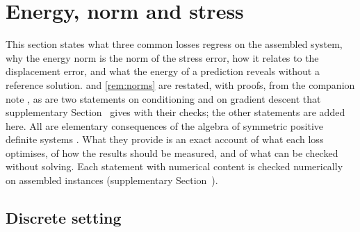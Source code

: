 \section{Energy, norm and stress}\label{sec:theory}

This section states what three common losses regress on the assembled system, why the energy
norm is the norm of the stress error, how it relates to the displacement error, and what the
energy of a prediction reveals without a reference solution.  and
\cref{rem:norms} are restated, with proofs, from the companion note \cite{CaoSong2026}, as
are two statements on conditioning and on gradient descent that supplementary
Section~\SuppRepro{} gives with their checks; the other statements are added here. All are
elementary consequences of the algebra of symmetric positive definite systems
\cite{Ciarlet1978,Saad2003}. What they provide is an exact account of what each loss
optimises, of how the results should be measured, and of what can be checked without
solving. Each statement with numerical content is checked numerically on assembled instances
(supplementary Section~\SuppRepro).

\subsection{Discrete setting}\label{sec:theory:setting}

